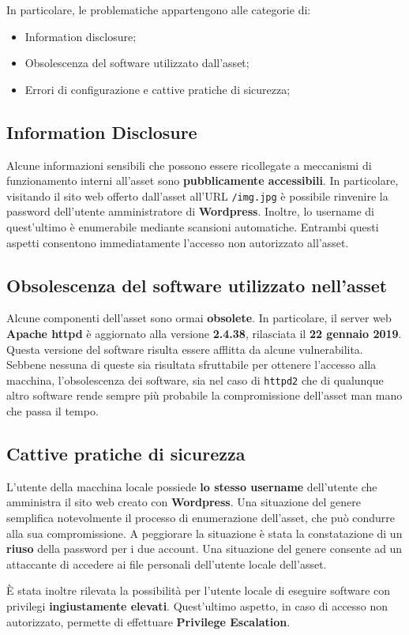\documentclass[a4paper, 12pt, oneside]{article}
\begin{document}
In particolare, le problematiche appartengono alle categorie di:

\begin{itemize}
    \item Information disclosure;
    \item Obsolescenza del software utilizzato dall'asset;
    \item Errori di configurazione e cattive pratiche di sicurezza;
\end{itemize}

\subsection{Information Disclosure}
Alcune informazioni sensibili che possono essere ricollegate a meccanismi di funzionamento interni all'asset sono \textbf{pubblicamente accessibili}. In particolare, visitando il sito web offerto dall'asset all'URL \texttt{/img.jpg} è possibile rinvenire la password dell'utente amministratore di \textbf{Wordpress}. Inoltre, lo username di quest'ultimo è enumerabile mediante scansioni automatiche. Entrambi questi aspetti consentono immediatamente l'accesso non autorizzato all'asset.

\subsection{Obsolescenza del software utilizzato nell'asset}
Alcune componenti dell'asset sono ormai \textbf{obsolete}. In particolare, il server web \textbf{Apache httpd} è aggiornato alla versione \textbf{2.4.38}, rilasciata il \textbf{22 gennaio 2019}. Questa versione del software risulta essere afflitta da alcune vulnerabilita. Sebbene nessuna di queste sia risultata sfruttabile per ottenere l'accesso alla macchina, l'obsolescenza dei software, sia nel caso di \texttt{httpd2} che di qualunque altro software rende sempre più probabile la compromissione dell'asset man mano che passa il tempo.

\subsection{Cattive pratiche di sicurezza}
L'utente della macchina locale possiede \textbf{lo stesso username} dell'utente che amministra il sito web creato con \textbf{Wordpress}. Una situazione del genere semplifica notevolmente il processo di enumerazione dell'asset, che può condurre alla sua compromissione. A peggiorare la situazione è stata la constatazione di un \textbf{riuso} della password per i due account. Una situazione del genere consente ad un attaccante di accedere ai file personali dell'utente locale dell'asset. 

È stata inoltre rilevata la possibilità per l'utente locale di eseguire software con privilegi \textbf{ingiustamente elevati}. Quest'ultimo aspetto, in caso di accesso non autorizzato, permette di effettuare \textbf{Privilege Escalation}.

\newpage
\printbibliography[title={Riferimenti bibliografici}]
\end{document}
